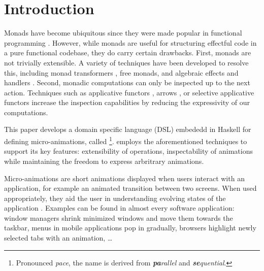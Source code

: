 \section{Introduction}
\label{sec:intro}

Monads have become ubiquitous since they were made popular in functional programming \cite{DBLP:conf/lfp/Wadler90}. However, while monads are useful for structuring effectful code in a pure functional codebase, they do carry certain drawbacks. First, monads are not trivially extensible. A variety of techniques have been developed to resolve this, including monad transformers \cite{DBLP:conf/popl/LiangHJ95}, free monads, and algebraic effects and handlers \cite{DBLP:conf/esop/PlotkinP09}. Second, monadic computations can only be inspected up to the next action. Techniques such as applicative functors \cite{DBLP:journals/jfp/McbrideP08}, arrows \cite{DBLP:journals/scp/Hughes00}, or selective applicative functors \cite{Mokhov:2019:SAF:3352468.3341694} increase the inspection capabilities by reducing the expressivity of our computations.

This paper develops a domain specific language (DSL) embededd in Haskell for defining micro-animations, called \dsl{}\footnote{Pronounced \textit{pace}, the name is derived from \textit{\textbf{pa}rallel} and \textit{\textbf{se}quential}.}. \dsl{} employs the aforementioned techniques to support its key features: extensibility of operations, inspectability of animations while maintaining the freedom to express arbritrary animations.

Micro-animations are short animations displayed when users interact with an application, for example an animated transition between two screens. When used appropriately, they aid the user in understanding evolving states of the application \cite{DBLP:conf/infovis/BedersonB99} \cite{DBLP:conf/chi/Gonzalez96} \cite{DBLP:journals/tvcg/HeerR07}. Examples can be found in almost every software application: window managers shrink minimized windows and move them towards the taskbar, menus in mobile applications pop in gradually, browsers highlight newly selected tabs with an animation, \ldots

